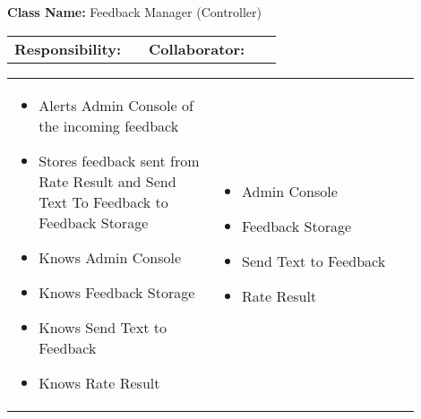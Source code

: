 \begin{red_cards}[]
    \textbf{Class Name:} Feedback Manager (Controller)
    \tcbline
    \begin{tabular}{p{0.45\linewidth} | p{0.45\linewidth}}
        \textbf{Responsibility:}& 
        \textbf{Collaborator:}\\
    \end{tabular}
    \tcbline
    \begin{tabular}{p{0.45\linewidth} | p{0.45\linewidth}}
        \begin{itemize}
            
            \item Alerts Admin Console of the incoming feedback
            \item Stores feedback sent from Rate Result and Send Text To Feedback to Feedback Storage
            \item Knows Admin Console
            \item Knows Feedback Storage
            \item Knows Send Text to Feedback
            \item Knows Rate Result
        \end{itemize}
        &
        \begin{itemize}
            \item Admin Console
            \item Feedback Storage
            \item Send Text to Feedback
            \item Rate Result
        \end{itemize}
    \end{tabular}
\end{red_cards}